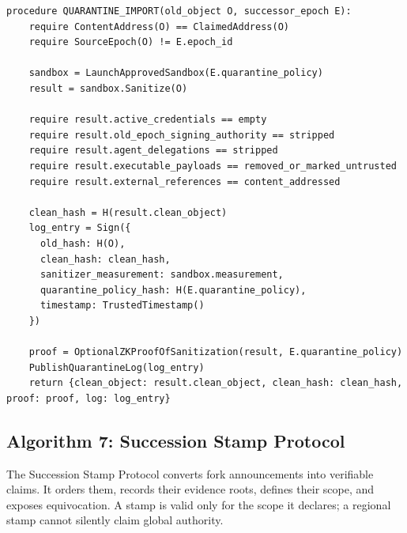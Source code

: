 \documentclass[11pt,letterpaper]{article}
\begin{document}
\begin{lstlisting}[caption={Old-network quarantine import}]
procedure QUARANTINE_IMPORT(old_object O, successor_epoch E):
    require ContentAddress(O) == ClaimedAddress(O)
    require SourceEpoch(O) != E.epoch_id

    sandbox = LaunchApprovedSandbox(E.quarantine_policy)
    result = sandbox.Sanitize(O)

    require result.active_credentials == empty
    require result.old_epoch_signing_authority == stripped
    require result.agent_delegations == stripped
    require result.executable_payloads == removed_or_marked_untrusted
    require result.external_references == content_addressed

    clean_hash = H(result.clean_object)
    log_entry = Sign({
      old_hash: H(O),
      clean_hash: clean_hash,
      sanitizer_measurement: sandbox.measurement,
      quarantine_policy_hash: H(E.quarantine_policy),
      timestamp: TrustedTimestamp()
    })

    proof = OptionalZKProofOfSanitization(result, E.quarantine_policy)
    PublishQuarantineLog(log_entry)
    return {clean_object: result.clean_object, clean_hash: clean_hash, proof: proof, log: log_entry}
\end{lstlisting}

\subsection{Algorithm 7: Succession Stamp Protocol}

The Succession Stamp Protocol converts fork announcements into verifiable claims. It orders them, records their evidence roots, defines their scope, and exposes equivocation. A stamp is valid only for the scope it declares; a regional stamp cannot silently claim global authority.
\end{document}
